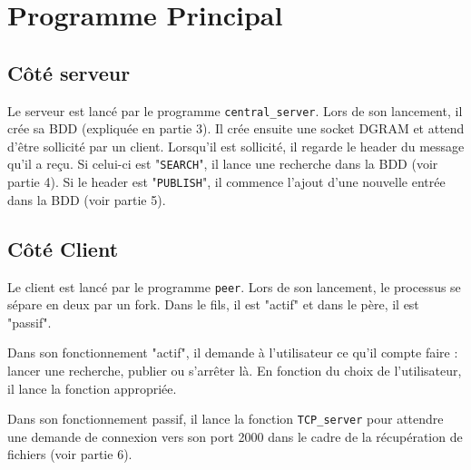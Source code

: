 \section{Programme Principal}
\subsection{Côté serveur}
Le serveur est lancé par le programme \verb|central_server|. Lors de son lancement,  il crée sa BDD (expliquée en partie 3). Il crée ensuite une socket DGRAM et attend d'être sollicité par un client.
\vskip 0.25cm
Lorsqu'il est sollicité, il regarde le header du message qu'il a reçu. Si celui-ci est "\verb|SEARCH|", il lance une recherche dans la BDD (voir partie 4). Si le header est "\verb|PUBLISH|", il commence l'ajout d'une nouvelle entrée dans la BDD (voir partie 5).

\subsection{Côté Client}
Le client est lancé par le programme \verb|peer|. Lors de son lancement, le processus se sépare en deux par un fork. Dans le fils, il est "actif" et dans le père, il est "passif".
\vskip 0.25cm

Dans son fonctionnement "actif", il demande à l'utilisateur ce qu'il compte faire : lancer une recherche, publier ou s'arrêter là. En fonction du choix de l'utilisateur, il lance la fonction appropriée.\\
\vskip 0.25cm

Dans son fonctionnement passif, il lance la fonction \verb|TCP_server| pour attendre une demande de connexion vers son port 2000 dans le cadre de la récupération de fichiers (voir partie 6).
